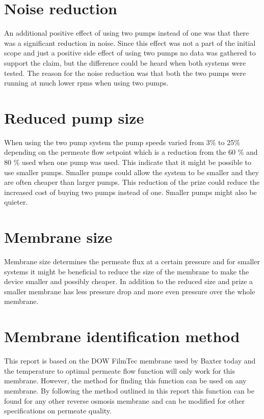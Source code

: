 \section{Noise reduction}

An additional positive effect of using two pumps instead of one was that there was a significant reduction in noise. Since this effect was not a part of the initial scope and just a positive side effect of using two pumps no data was gathered to support the claim, but the difference could be heard when both systems were tested. The reason for the noise reduction was that both the two pumps were running at much lower rpms when using two pumps. 

\section{Reduced pump size}
When using the two pump system the pump speeds varied from 3\% to 25\% depending on the permeate flow setpoint which is a reduction from the 60 \% and 80 \% used when one pump was used. This indicate that it might be possible to use smaller pumps. Smaller pumps could allow the system to be smaller and they are often cheaper than larger pumps. This reduction of the prize could reduce the increased cost of buying two pumps instead of one. Smaller pumps might also be quieter.

\section{Membrane size}
Membrane size determines the permeate flux at a certain pressure and for smaller systems it might be beneficial to reduce the size of the membrane to make the device smaller and possibly cheaper. In addition to the reduced size and prize a smaller membrane has less pressure drop and more even pressure over the whole membrane.

\section{Membrane identification method}
This report is based on the DOW FilmTec membrane used by Baxter today and the temperature to optimal permeate flow function will only work for this membrane. However, the method for finding this function can be used on any membrane. By following the method outlined in this report this function can be found for any other reverse osmosis membrane and can be modified for other specifications on permeate quality. 

